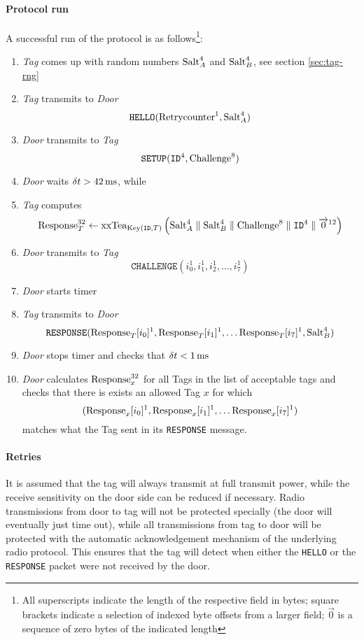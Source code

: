 \documentclass[a4paper,10pt]{scrartcl}
\begin{document}
\paragraph{Protocol run} A successful run of the protocol is as follows\footnote{All superscripts indicate the length of the respective field in bytes; square brackets indicate a selection of indexed byte offsets from a larger field; $\overrightarrow{0}$ is a sequence of zero bytes of the indicated length}:
\begin{enumerate}
\item \emph{Tag} comes up with random numbers $\textnormal{Salt}_A^{4}$ and $\textnormal{Salt}_B^{4}$, see section \ref{sec:tag-rng}
\item \emph{Tag} transmits to \emph{Door} $$\texttt{HELLO}(\textnormal{Retrycounter}^1,\textnormal{Salt}_A^{4})$$
\item \emph{Door} transmits to \emph{Tag} $$\texttt{SETUP}(\texttt{ID}^{4}, \textnormal{Challenge}^{8})$$
\item \emph{Door} waits $\delta t > 42\,\textnormal{ms}$, while
\item \emph{Tag} computes $$\textnormal{Response}_T^{32} \leftarrow \textnormal{xxTea}_{\textnormal{\scriptsize{Key}}(\texttt{\scriptsize{ID}},T)}\left( \textnormal{Salt}_A^4 \parallel \textnormal{Salt}_B^4 \parallel \textnormal{Challenge}^8 \parallel \texttt{ID}^4 \parallel \overrightarrow{0}^{12} \right)$$
\item \emph{Door} transmits to \emph{Tag} $$\texttt{CHALLENGE}(i_0^1, i_1^1, i_2^1, \ldots, i_7^1)$$
\item \emph{Door} starts timer
\item \emph{Tag} transmits to \emph{Door} $$\texttt{RESPONSE}( \textnormal{Response}_T[i_0]^1, \textnormal{Response}_T[i_1]^1, \ldots \textnormal{Response}_T[i_7]^1, \textnormal{Salt}_B^4 )$$
\item \emph{Door} stops timer and checks that $\delta t < 1\,\textnormal{ms}$
\item \emph{Door} calculates $\textnormal{Response}_x^{32}$ for all Tags in the list of acceptable tags and checks that there is exists an allowed Tag $x$ for which $$(\textnormal{Response}_x[i_0]^1, \textnormal{Response}_x[i_1]^1, \ldots \textnormal{Response}_x[i_7]^1)$$ matches what the Tag sent in its \texttt{RESPONSE} message.
\end{enumerate}

\paragraph{Retries}
It is assumed that the tag will always transmit at full transmit power, while the receive sensitivity on the door side can be reduced if necessary. Radio transmissions from door to tag will not be protected specially (the door will eventually just time out), while all transmissions from tag to door will be protected with the automatic acknowledgement mechanism of the underlying radio protocol. This ensures that the tag will detect when either the \texttt{HELLO} or the \texttt{RESPONSE} packet were not received by the door.
\end{document}
